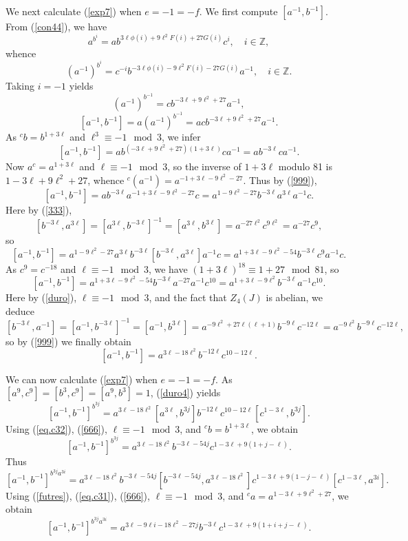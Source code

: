 \documentclass{amsart}
\theoremstyle{definition}
\theoremstyle{remark}
\newcommand \Z{{\mathbb Z}}
\begin{document}
{We next calculate (\ref{exp7}) when $e=-1=-f$. We first compute $[a^{-1},b^{-1}]$. From (\ref{con44}), we have
$$
a^{b^i}=a b^{3\ell\phi(i)+ 9\ell^2 F(i)+27G(i)} c^i,\quad i\in \Z,
$$
whence
$$
(a^{-1})^{b^i}=c^{-i} b^{-3\ell\phi(i)- 9\ell^2 F(i)-27G(i)} a^{-1},\quad i\in \Z.
$$
Taking $i=-1$ yields
$$
(a^{-1})^{b^{-1}}=c b^{-3\ell+9\ell^2+27} a^{-1},
$$
$$
[a^{-1},b^{-1}]=a(a^{-1})^{b^{-1}}=ac b^{-3\ell+9\ell^2+27} a^{-1}.
$$
As ${}^c b=b^{1+3\ell}$ and $\ell^3\equiv -1\mod 3$, we infer
$$
[a^{-1},b^{-1}]=ab^{(-3\ell+9\ell^2+27)(1+3\ell)} c a^{-1}=ab^{-3\ell} c a^{-1}.
$$
Now $a^c=a^{1+3\ell}$ and $\ell\equiv -1\mod 3$, so the inverse of $1+3\ell$ modulo 81 is $1-3\ell+9\ell^2+27$, whence 
${}^c (a^{-1})=a^{-1+3\ell-9\ell^2-27}$. Thus
by (\ref{999}),
$$
[a^{-1},b^{-1}]=ab^{-3\ell} a^{-1+3\ell-9\ell^2-27} c=a^{1-9\ell^2-27} b^{-3\ell} a^{3\ell}a^{-1} c.
$$
Here by (\ref{333}),
$$
[b^{-3\ell}, a^{3\ell}]=[a^{3\ell},b^{-3\ell}]^{-1}=[a^{3\ell},b^{3\ell}]=a^{-27\ell^2}c^{9\ell^2}=
a^{-27}c^{9},
$$
so
$$
[a^{-1},b^{-1}]=a^{1-9\ell^2-27} a^{3\ell}b^{-3\ell}[b^{-3\ell}, a^{3\ell}] a^{-1} c=
a^{1+3\ell-9\ell^2-54}b^{-3\ell}c^9 a^{-1} c.
$$
As $c^9=c^{-18}$ and $\ell\equiv -1\mod 3$, we have $(1+3\ell)^{18}\equiv 1+27\mod 81$, so
$$
[a^{-1},b^{-1}]=
a^{1+3\ell-9\ell^2-54}b^{-3\ell}a^{-27} a^{-1} c^{10}=a^{1+3\ell-9\ell^2}b^{-3\ell}a^{-1} c^{10}.
$$
Here by (\ref{duro}), $\ell\equiv -1\mod 3$, and the fact that $Z_4(J)$ is abelian, we deduce
$$
[b^{-3\ell}, a^{-1}]=[a^{-1},b^{-3\ell}]^{-1}=[a^{-1},b^{3\ell}]=
a^{-9\ell^2+27\ell(\ell+1)}b^{-9\ell}c^{-12\ell}=a^{-9\ell^2}b^{-9\ell}c^{-12\ell},
$$
so by (\ref{999}) we finally obtain
\begin{equation}
\label{duro4}
[a^{-1},b^{-1}]=a^{3\ell-18\ell^2}b^{-12\ell}c^{10-12\ell}.
\end{equation}

We can now calculate (\ref{exp7}) when $e=-1=-f$. As $[a^9,c^9]=[b^3,c^9]=[a^9,b^3]=1$,
(\ref{duro4}) yields
$$
[a^{-1},b^{-1}]^{b^{3j}}=a^{3\ell-18\ell^2}[a^{3\ell},b^{3j}]b^{-12\ell}c^{10-12\ell}[c^{1-3\ell}, b^{3j}].
$$
Using (\ref{eq.c32}), (\ref{666}), $\ell\equiv -1\mod 3$, and ${}^c b=b^{1+3\ell}$, we obtain
$$
[a^{-1},b^{-1}]^{b^{3j}}=a^{3\ell-18\ell^2}b^{-3\ell-54j}
c^{1-3\ell +9(1+j-\ell)}.
$$
Thus 
$$
[a^{-1},b^{-1}]^{b^{3j}a^{3i}}=a^{3\ell-18\ell^2}b^{-3\ell-54j}[b^{-3\ell-54j},a^{3\ell-18\ell^2}] 
c^{1-3\ell +9(1-j-\ell)}[c^{1-3\ell},a^{3i}].
$$
Using (\ref{futres}), (\ref{eq.c31}), (\ref{666}), $\ell\equiv -1\mod 3$, and ${}^c a=a^{1-3\ell+9\ell^2+27}$, we obtain
\begin{equation}
\label{duro5}
[a^{-1},b^{-1}]^{b^{3j}a^{3i}}=a^{3\ell-9\ell i-18\ell^2-27j}b^{-3\ell}
c^{1-3\ell +9(1+i+j-\ell)}.
\end{equation}


}
\end{document}
